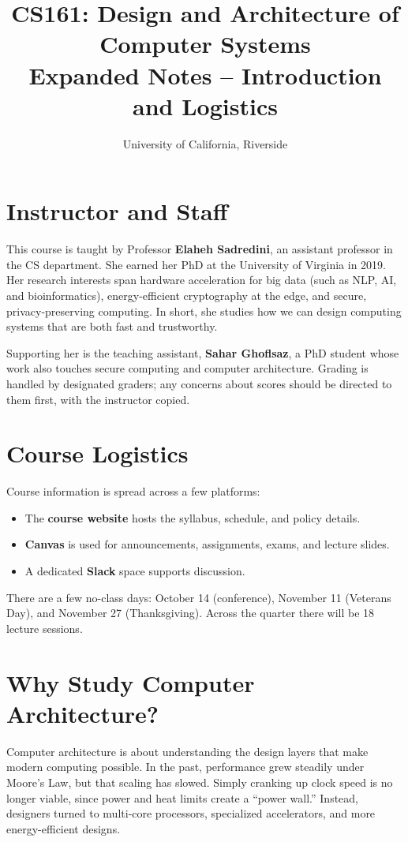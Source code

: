 \documentclass[11pt]{article}
\begin{document}
\title{CS161: Design and Architecture of Computer Systems \\[4pt]
Expanded Notes -- Introduction and Logistics}
\author{University of California, Riverside}
\date{}
\maketitle

\section*{Instructor and Staff}
This course is taught by Professor \textbf{Elaheh Sadredini}, an assistant professor in the CS department. She earned her PhD at the University of Virginia in 2019. Her research interests span hardware acceleration for big data (such as NLP, AI, and bioinformatics), energy-efficient cryptography at the edge, and secure, privacy-preserving computing. In short, she studies how we can design computing systems that are both fast and trustworthy.  

Supporting her is the teaching assistant, \textbf{Sahar Ghoflsaz}, a PhD student whose work also touches secure computing and computer architecture. Grading is handled by designated graders; any concerns about scores should be directed to them first, with the instructor copied.

\section*{Course Logistics}
Course information is spread across a few platforms:
\begin{itemize}
  \item The \textbf{course website} hosts the syllabus, schedule, and policy details.
  \item \textbf{Canvas} is used for announcements, assignments, exams, and lecture slides.
  \item A dedicated \textbf{Slack} space supports discussion.
\end{itemize}
There are a few no-class days: October 14 (conference), November 11 (Veterans Day), and November 27 (Thanksgiving). Across the quarter there will be 18 lecture sessions.

\section*{Why Study Computer Architecture?}
Computer architecture is about understanding the design layers that make modern computing possible. In the past, performance grew steadily under Moore’s Law, but that scaling has slowed. Simply cranking up clock speed is no longer viable, since power and heat limits create a “power wall.” Instead, designers turned to multi-core processors, specialized accelerators, and more energy-efficient designs.
\end{document}
